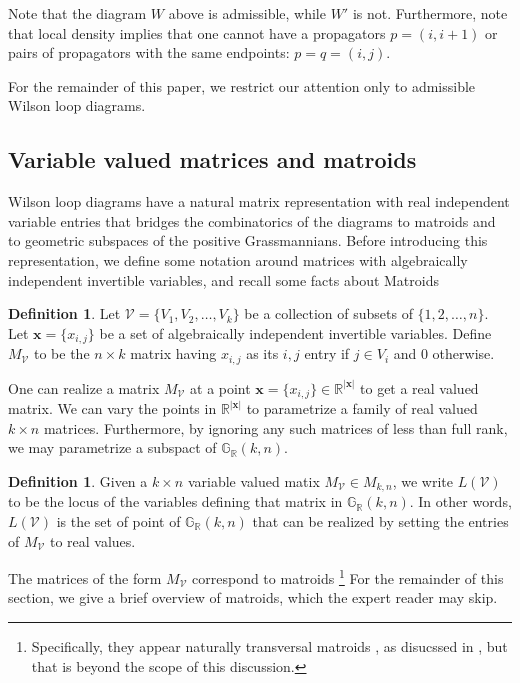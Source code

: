 \documentclass[11pt]{article}
\newcommand{\R}{\mathbb{R}}
\newcommand{\Grall}{\mathbb{G}_{\R}}
\newcommand{\cV}{\mathcal{V}}
\theoremstyle{remark}
\theoremstyle{definition}
\newtheorem{dfn}[thm]{Definition}
\begin{document}
Note that the diagram $W$ above is admissible, while $W'$ is not. Furthermore, note that local density implies that one cannot have a propagators $p = (i, i+1)$ or pairs of propagators with the same endpoints: $p = q = (i, j)$.

For the remainder of this paper, we restrict our attention only to admissible Wilson loop diagrams.


\subsection{Variable valued matrices and matroids \label{sec:matrices and matroids}}

Wilson loop diagrams have a natural matrix representation with real independent variable entries that bridges the combinatorics of the diagrams to matroids and to geometric subspaces of the positive Grassmannians. Before introducing this representation, we  define some notation around matrices with algebraically independent invertible variables, and recall some facts about Matroids

\begin{dfn} \label{dfn:variablevaluedmatrix}
Let $\cV = \{V_1, V_2, \dots, V_k\}$ be a collection of subsets of $\{1,2,\dots,n\}$. Let $\mathbf{x}=\{x_{i,j}\}$ be a set of algebraically independent invertible variables. Define $M_{\mathcal{V}}$ to be the $n \times k$ matrix having $x_{i,j}$ as its $i,j$ entry if $j \in V_i$ and $0$ otherwise.
\end{dfn}

One can realize a matrix $M_\cV$ at a point $\mathbf{x}=\{x_{i,j}\} \in \R^{|\mathbf{x}|}$ to get a real valued matrix. We can vary the points in $\R^{|\mathbf{x}|}$ to parametrize a family of real valued $k \times n$ matrices. Furthermore, by ignoring any such matrices of less than full rank, we may parametrize a subspact of $\Grall(k,n)$.

\begin{dfn} \label{dfn:loci}
Given a $k \times n$ variable valued matix $M_\cV \in M_{k,n}$, we write $L(\cV)$ to be the locus of the variables defining that matrix in $\Grall(k,n)$. In other words, $L(\cV)$ is the set of point of $\Grall(k,n)$ that can be realized by setting the entries of $M_\cV$ to real values.
\end{dfn}

The matrices of the form $M_\cV$ correspond to matroids \footnote{Specifically, they appear naturally transversal matroids \cite{????}, as disucssed in \cite{basisshapeloci}, but that is beyond the scope of this discussion.} For the remainder of this section, we give a brief overview of matroids, which the expert reader may skip. 
\end{document}
